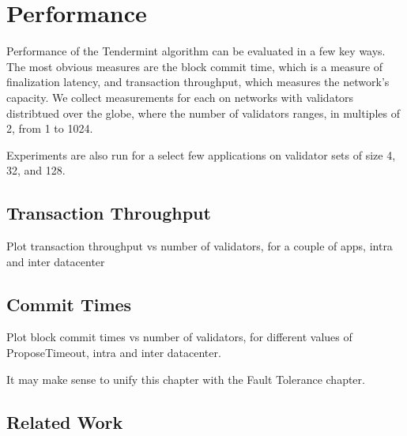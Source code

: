\chapter{Performance}
\label{ch:performance}

Performance of the Tendermint algorithm can be evaluated in a few key ways.
The most obvious measures are the block commit time, which is a measure of finalization latency, 
and transaction throughput, which measures the network's capacity.
We collect measurements for each on networks with validators distribtued over the globe, 
where the number of validators ranges, in multiples of 2, from 1 to 1024.

Experiments are also run for a select few applications on validator sets of size 4, 32, and 128.

\section{Transaction Throughput}

Plot transaction throughput vs number of validators, for a couple of apps, intra and inter datacenter

\section{Commit Times}

Plot block commit times vs number of validators, for different values of ProposeTimeout, intra and inter datacenter.


It may make sense to unify this chapter with the Fault Tolerance chapter.

\section{Related Work}
